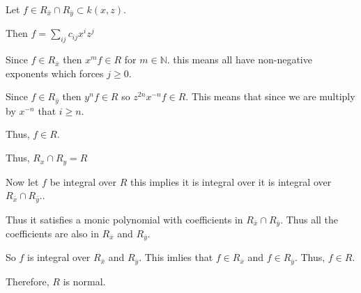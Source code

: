 \documentclass[12pt, letterpaper]{article}
\newcommand{\N}{\mathbb{N}}
\begin{document}
\begin{problemproof}
    Let $f \in R_{\bar{x}} \cap R_{\bar{y}} \subset k(x,z)$.

    Then $f=\sum_{ij}c_{ij}x^iz^j$

    Since $f \in R_{\bar{x}}$ then $x^mf \in R$ for $m \in \N$. this means all have non-negative exponents which forces $j \geq 0$.

    Since $f \in R_{\bar{y}}$ then $y^nf \in R$ so $z^{2n}x^{-n}f \in R$. This means that since we are multiply by $x^{-n}$ that $i \geq n$.

    Thus, $f \in R$.
    
    Thus, $R_x \cap R_y = R$

    Now let $f$ be integral over $R$ this implies it is integral over it is integral over $R_{\bar{x}} \cap R_{\bar{y}}$..

    Thus it satisfies a monic polynomial with coefficients in $R_{\bar{x}} \cap R_{\bar{y}}$. Thus all the coefficients are also in $R_{\bar{x}}$ and $R_{\bar{y}}$.

    So $f$ is integral over $R_{\bar{x}}$ and $R_{\bar{y}}$. This imlies that $f \in R_{\bar{x}}$ and $f \in R_{\bar{y}}$. Thus, $f \in R$.

    Therefore, $R$ is normal.
\end{problemproof}
\end{document}
